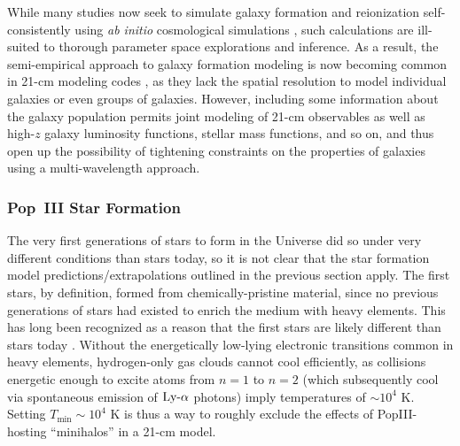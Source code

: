 While many studies now seek to simulate galaxy formation and reionization self-consistently using \textit{ab initio} cosmological simulations \cite{OShea2015,Gnedin2014}, such calculations are ill-suited to thorough parameter space explorations and inference. As a result, the semi-empirical approach to galaxy formation modeling is now becoming common in 21-cm modeling codes \cite{Mirocha2017,Park2019,Mutch2016}, as they lack the spatial resolution to model individual galaxies or even groups of galaxies. However, including some information about the galaxy population permits joint modeling of 21-cm observables as well as high-$z$ galaxy luminosity functions, stellar mass functions, and so on, and thus open up the possibility of tightening constraints on the properties of galaxies using a multi-wavelength approach.

\subsubsection{Pop~III Star Formation}
The very first generations of stars to form in the Universe did so under very different conditions than stars today, so it is not clear that the star formation model predictions/extrapolations outlined in the previous section apply. The first stars, by definition, formed from chemically-pristine material, since no previous generations of stars had existed to enrich the medium with heavy elements. This has long been recognized as a reason that the first stars are likely different than stars today \cite{Abel2000,Bromm1999}. Without the energetically low-lying electronic transitions common in heavy elements, hydrogen-only gas clouds cannot cool efficiently, as collisions energetic enough to excite atoms from $n=1$ to $n=2$ (which subsequently cool via spontaneous emission of $\text{Ly-}\alpha$ photons) imply temperatures of $\sim 10^4$ K. Setting $T_{\min} \sim 10^4$ K is thus a way to roughly exclude the effects of PopIII-hosting ``minihalos'' in a 21-cm model. 

